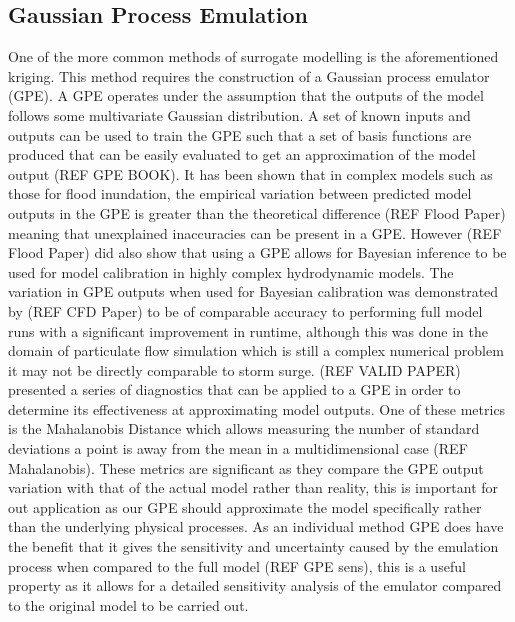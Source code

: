 \documentclass[12pt,a4paper]{article}
\begin{document}
\subsection{Gaussian Process Emulation}
\noindent
One of the more common methods of surrogate modelling is the aforementioned kriging. This method requires the construction of a Gaussian process  emulator (GPE). A GPE operates under the assumption that the outputs of the model follows some multivariate Gaussian distribution. A set of known inputs and outputs can be used to train the GPE such that a set of basis functions are produced that can be easily evaluated to get an approximation of the model output (REF GPE BOOK). It has been shown that in complex models such as those for flood inundation, the empirical variation between predicted model outputs in the GPE is greater than the theoretical difference (REF Flood Paper) meaning that unexplained inaccuracies can be present in a GPE. However (REF Flood Paper) did also show that using a GPE allows for Bayesian inference to be used for model calibration in highly complex hydrodynamic models. The variation in GPE outputs when used for Bayesian calibration was demonstrated by (REF CFD Paper) to be of comparable accuracy to performing full model runs with a significant improvement in runtime, although this was done in the domain of particulate flow simulation which is still a complex numerical problem it may not be directly comparable to storm surge. (REF VALID PAPER) presented a series of diagnostics that can be applied to a GPE in order to determine its effectiveness at approximating model outputs. One of these metrics is the Mahalanobis Distance which allows measuring the number of standard deviations a point is away from the mean in a multidimensional case (REF Mahalanobis). These metrics are significant as they compare the GPE output variation with that of the actual model rather than reality, this is important for out application as our GPE should approximate the model specifically rather than the underlying physical processes. As an individual method GPE does have the benefit that it gives the sensitivity and uncertainty caused by the emulation process when compared to the full model (REF GPE sens), this is a useful property as it allows for a detailed sensitivity analysis of the emulator compared to the original model to be carried out.
\end{document}
